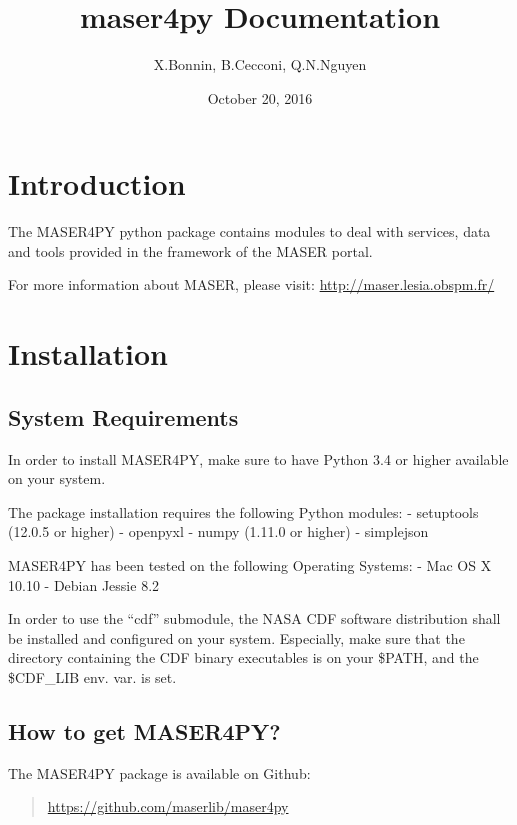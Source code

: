 \documentclass[letterpaper,10pt,english]{sphinxmanual}
\title{maser4py Documentation}
\date{October 20, 2016}
\author{X.Bonnin, B.Cecconi, Q.N.Nguyen}
\begin{document}
\maketitle
\tableofcontents
{}\label{index::doc}



\chapter{Introduction}
\label{intro:welcome-to-maser4py-s-documentation}\label{intro:introduction}\label{intro::doc}
The MASER4PY python package contains modules to
deal with services, data and tools provided in the framework
of the MASER portal.

For more information about MASER, please visit: \href{http://maser.lesia.obspm.fr/}{http://maser.lesia.obspm.fr/}


\chapter{Installation}
\label{intro:installation}

\section{System Requirements}
\label{intro:system-requirements}
In order to install MASER4PY, make sure to have Python 3.4 or higher
available on your system.

The package installation requires the following Python modules:
- setuptools (12.0.5 or higher)
- openpyxl
- numpy (1.11.0 or higher)
- simplejson

MASER4PY has been tested on the following Operating Systems:
- Mac OS X 10.10
- Debian Jessie 8.2

In order to use the ``cdf'' submodule, the NASA CDF software
distribution shall be installed and configured on your system.
Especially, make sure that the directory containing the CDF binary
executables is on your \$PATH, and the \$CDF\_LIB env. var. is set.


\section{How to get MASER4PY?}
\label{intro:how-to-get-maser4py}
The MASER4PY package is available on Github:
\begin{quote}

\href{https://github.com/maserlib/maser4py}{https://github.com/maserlib/maser4py}
\end{quote}
\end{document}
